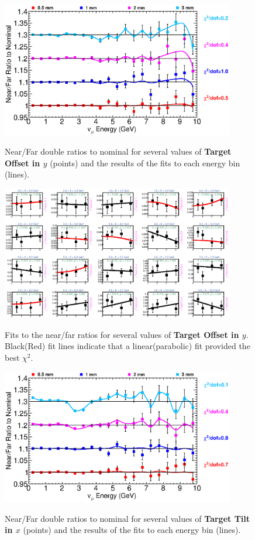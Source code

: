 \begin{figure}[ht]
  \begin{center}
    {\includegraphics[width=4.0in]{figures/TargetYOffset_nof_summary.eps}}
  \end{center}
\caption{ Near/Far double ratios to nominal for several values of {\bf Target Offset in $y$} (points) and the results of the fits to each energy bin (lines).}
\end{figure}

\begin{figure}[hb]
  \begin{center}
    {\includegraphics[width=4.0in]{figures/TargetYOffset_nof_fits.eps}}
  \end{center}
\caption{ Fits to the near/far ratios for several values of {\bf Target Offset in $y$}. Black(Red) fit lines indicate that a linear(parabolic) fit provided the best $\chi^2$. }
\end{figure}

\begin{figure}[ht]
  \begin{center}
    {\includegraphics[width=4.0in]{figures/TargetXTilt_nof_summary.eps}}
  \end{center}
\caption{ Near/Far double ratios to nominal for several values of {\bf Target Tilt in $x$} (points) and the results of the fits to each energy bin (lines).}
\end{figure}

